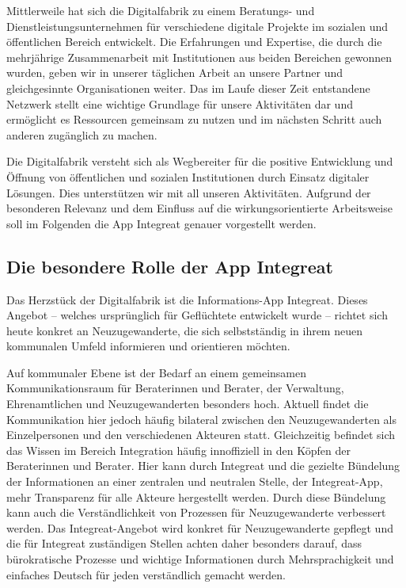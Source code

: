 \documentclass[12pt, a4paper]{article} %
\begin{document}
Mittlerweile hat sich die Digitalfabrik zu einem Beratungs- und
Dienstleistungsunternehmen für verschiedene digitale Projekte im
sozialen und öffentlichen Bereich entwickelt. Die Erfahrungen und
Expertise, die durch die mehrjährige Zusammenarbeit mit Institutionen
aus beiden Bereichen gewonnen wurden, geben wir in unserer täglichen
Arbeit an unsere Partner und gleichgesinnte Organisationen weiter. Das
im Laufe dieser Zeit entstandene Netzwerk stellt eine wichtige Grundlage
für unsere Aktivitäten dar und ermöglicht es Ressourcen gemeinsam zu
nutzen und im nächsten Schritt auch anderen zugänglich zu machen.

Die Digitalfabrik versteht sich als Wegbereiter für die positive
Entwicklung und Öffnung von öffentlichen und sozialen Institutionen
durch Einsatz digitaler Lösungen. Dies unterstützen wir mit all unseren
Aktivitäten. Aufgrund der besonderen Relevanz und dem Einfluss auf die
wirkungsorientierte Arbeitsweise soll im Folgenden die App Integreat
genauer vorgestellt werden.

\hypertarget{die-besondere-rolle-der-app-integreat}{%
\subsection{Die besondere Rolle der App
Integreat}\label{die-besondere-rolle-der-app-integreat}}

Das Herzstück der Digitalfabrik ist die Informations-App Integreat.
Dieses Angebot – welches ursprünglich für Geflüchtete entwickelt wurde –
richtet sich heute konkret an Neuzugewanderte, die sich selbstständig in
ihrem neuen kommunalen Umfeld informieren und orientieren möchten.

Auf kommunaler Ebene ist der Bedarf an einem gemeinsamen
Kommunikationsraum für Beraterinnen und Berater, der Verwaltung,
Ehrenamtlichen und Neuzugewanderten besonders hoch. Aktuell findet die
Kommunikation hier jedoch häufig bilateral zwischen den Neuzugewanderten
als Einzelpersonen und den verschiedenen Akteuren statt. Gleichzeitig
befindet sich das Wissen im Bereich Integration häufig innoffiziell in
den Köpfen der Beraterinnen und Berater. Hier kann durch Integreat und
die gezielte Bündelung der Informationen an einer zentralen und
neutralen Stelle, der Integreat-App, mehr Transparenz für alle Akteure
hergestellt werden. Durch diese Bündelung kann auch die Verständlichkeit
von Prozessen für Neuzugewanderte verbessert werden. Das
Integreat-Angebot wird konkret für Neuzugewanderte gepflegt und die für
Integreat zuständigen Stellen achten daher besonders darauf, dass
bürokratische Prozesse und wichtige Informationen durch Mehrsprachigkeit
und einfaches Deutsch für jeden verständlich gemacht werden.
\end{document}
